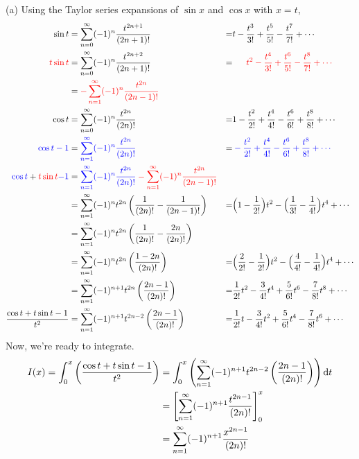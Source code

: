 \begin{solution} (a)
Using the Taylor series expansions of $\sin x$ and $\cos x$ with $x=t$,
\begingroup
\allowdisplaybreaks
\begin{align*}
\sin t &= \sum_{n=0}^\infty (-1)^n\frac{t^{2n+1}}{(2n+1)!}&=& t-\frac{t^3}{3!}+\frac{t^5}{5!}-\frac{t^7}{7!}+\cdots\\
\color{red}t\sin t &= \sum_{n=0}^\infty (-1)^n\frac{t^{2n+2}}{(2n+1)!}&=&\color{red}\phantom{1-\ }t^2-\frac{t^4}{3!}+\frac{t^6}{5!}-\frac{t^8}{7!}+\cdots\\
&=\color{red} -\sum_{n=1}^\infty (-1)^n\frac{t^{2n}}{(2n-1)!}\\
\cos t &=\sum_{n=0}^\infty (-1)^n\frac{t^{2n}}{(2n)!}&=& 1-\frac{t^2}{2!}+\frac{t^4}{4!}-\frac{t^6}{6!}+\frac{t^8}{8!}+\cdots\\
\color{blue}\cos t-1 &=\color{blue}\sum_{n=1}^\infty (-1)^n\frac{t^{2n}}{(2n)!}&=&\color{blue} -\frac{t^2}{2!}+\frac{t^4}{4!}-\frac{t^6}{6!}+\frac{t^8}{8!}+\cdots\\
\textcolor{blue}{\cos t} + \textcolor{red}{t\sin t}\textcolor{blue}{ -1}&=\color{blue}\sum_{n=1}^\infty (-1)^n\frac{t^{2n}}{(2n)!}\color{red}-\sum_{n=1}^\infty (-1)^n\frac{t^{2n}}{(2n-1)!}
\\&=\sum_{n=1}^\infty (-1)^nt^{2n}\left(\frac{1}{(2n)!}-\frac{1}{(2n-1)!}\right)&=&\Big(1-\frac{1}{2!}\Big)t^2
-\Big(\frac{1}{3!}-\frac{1}{4!}\Big)t^4
+\cdots\\
&=\sum_{n=1}^\infty (-1)^nt^{2n}\left(\frac{1}{(2n)!}-\frac{2n}{(2n)!}\right)\\
&=\sum_{n=1}^\infty (-1)^nt^{2n}\left(\frac{1-2n}{(2n)!}\right)
&=&\Big(\frac{2}{2!}-\frac{1}{2!}\Big)t^2
-\Big(\frac{4}{4!}-\frac{1}{4!}\Big)t^4
+\cdots\\
&=\sum_{n=1}^\infty (-1)^{n+1}t^{2n}\left(\frac{2n-1}{(2n)!}\right)
&=&\frac{1}{2!}t^2-\frac{3}{4!}t^4
+\frac{5}{6!}t^6
-\frac{7}{8!}t^8+\cdots\\
\frac{\cos t + t\sin t -1}{t^2}&=\sum_{n=1}^\infty (-1)^{n+1}t^{2n-2}\left(\frac{2n-1}{(2n)!}\right)
&=&\frac{1}{2!}t-\frac{3}{4!}t^2
+\frac{5}{6!}t^4
-\frac{7}{8!}t^6+\cdots\\
\end{align*}
\endgroup
Now, we're ready to integrate.
\begin{align*}
I(x)=\int_0^x\left( \frac{\cos t + t\sin t -1}{t^2}\right)&=\int_0^x \left(\sum_{n=1}^\infty (-1)^{n+1}t^{2n-2}\left(\frac{2n-1}{(2n)!} \right)\right) \mathrm{d}t\\
&= \left[\sum_{n=1}^\infty (-1)^{n+1}\frac{t^{2n-1}}{(2n)!}\right]_0^x\\
&=\sum_{n=1}^\infty (-1)^{n+1}\frac{x^{2n-1}}{(2n)!}
\end{align*}


\end{solution}
